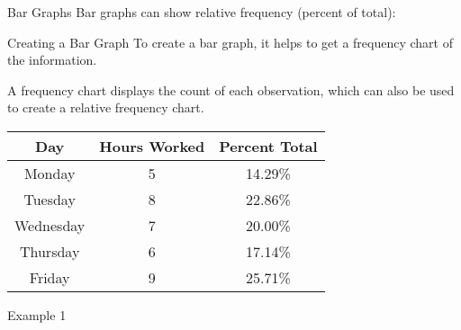 \documentclass[t]{beamer}
\begin{document}
\begin{frame}{Bar Graphs}
Bar graphs can show relative frequency (percent of total):	\newline\\
\begin{center}
\end{center}
\end{frame}

\begin{frame}{Creating a Bar Graph}
To create a bar graph, it helps to get a frequency chart of the information. \newline\\	\pause

A frequency chart displays the count of each observation, which can also be used to create a relative frequency chart.	\newline\\	\pause
\begin{center}
\begin{tabular}{c|c|c}
\textbf{Day} & \textbf{Hours Worked} & \textbf{Percent Total} \\ \hline
Monday 		& 	5	&	14.29\%	\\
Tuesday 	& 	8	&	22.86\%	\\
Wednesday	&	7	&	20.00\%	\\
Thursday	&	6	&	17.14\%	\\
Friday		&	9	&	25.71\%	\\
\end{tabular}
\end{center}
\end{frame}

\begin{frame}{Example 1}

\end{frame}

\end{document}
